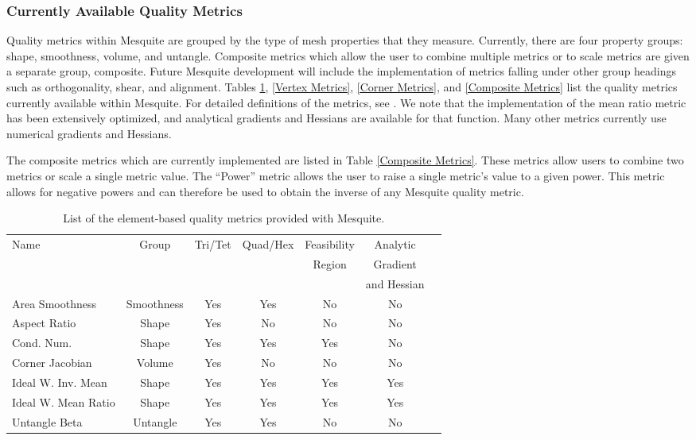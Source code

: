 \subsubsection{Currently Available Quality Metrics}  
Quality metrics within
Mesquite are grouped by the type of mesh properties that they measure.
Currently, there are four property groups: shape, smoothness, volume,
and untangle.  Composite metrics which allow the user to combine
multiple metrics or to scale metrics are given a separate group,
composite.  Future Mesquite development will include the
implementation of metrics falling under other group headings such as
orthogonality, shear, and alignment.  Tables \ref{Element Metrics},
\ref{Vertex Metrics}, \ref{Corner Metrics}, and \ref{Composite Metrics}
list the quality metrics currently available within Mesquite.  For
detailed definitions of the metrics, see \cite{Kn01}.  We note that
the implementation of the mean ratio metric has been extensively
optimized, and analytical gradients and Hessians are available for
that function.  Many other metrics currently use numerical gradients and
Hessians.

The composite metrics which are currently implemented are listed
in Table \ref{Composite Metrics}.  These metrics allow users to
combine two metrics or scale a single metric value.
The ``Power'' metric allows the user to raise a single metric's
value to a given power. This metric allows for negative powers
and can therefore be used to obtain the inverse of any Mesquite
quality metric.  

\begin{table}[!hp]
\begin{center}
\begin{tabular}{|l|c|c|c|c|c|c|}
\hline
Name               & Group      & Tri/Tet & Quad/Hex & Feasibility & Analytic  \\
                   &            &         &          & Region      & Gradient \\
                   &            &         &          &             & and Hessian   \\  
\hline
Area Smoothness    & Smoothness & Yes     & Yes      & No          & No    \\
Aspect Ratio       & Shape      & Yes     & No       & No          & No    \\
Cond. Num.         & Shape      & Yes     & Yes      & Yes         & No    \\
Corner Jacobian    & Volume     & Yes     & No       & No          & No    \\
Ideal W. Inv. Mean & Shape      & Yes     & Yes      & Yes         & Yes   \\
Ideal W. Mean Ratio& Shape      & Yes     & Yes      & Yes         & Yes   \\
Untangle Beta      & Untangle   & Yes     & Yes      & No          & No    \\
\hline
\end{tabular}
\caption{List of the element-based quality metrics provided with Mesquite.}
\label{Element Metrics}
\end{center}
\end{table}


